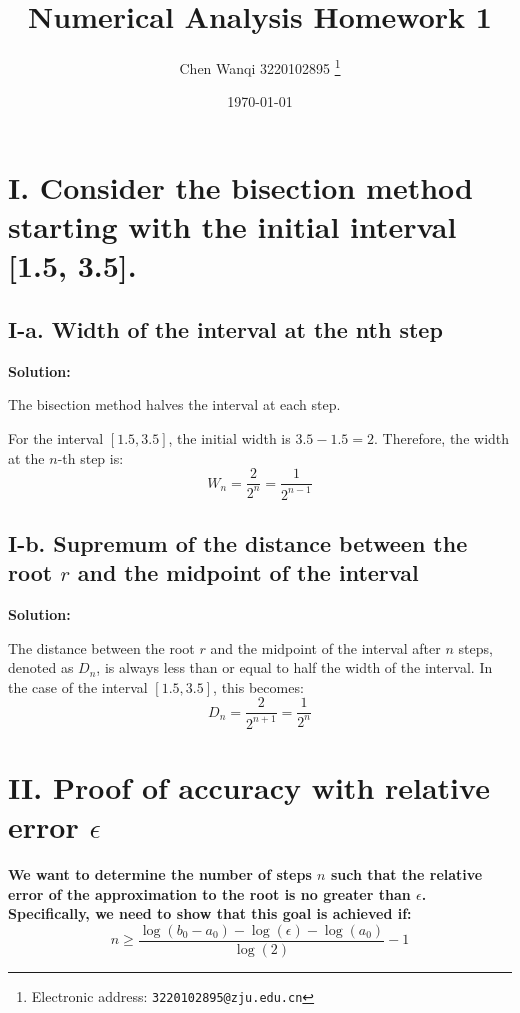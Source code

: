 \documentclass[a4paper]{article}
\begin{document}
\title{Numerical Analysis Homework  1}

\author{Chen Wanqi 3220102895
  \thanks{Electronic address: \texttt{3220102895@zju.edu.cn}}}


\date{\today}

\maketitle

\section*{I. Consider the bisection method starting with the initial interval [1.5, 3.5]. }
\subsection*{I-a. Width of the interval at the nth step}

\textbf{Solution:}

The bisection method halves the interval at each step.

For the interval $[1.5, 3.5]$, the initial width is $3.5 - 1.5 = 2$. Therefore, the width at the $n$-th step is: 
\[
W_n = \frac{2}{2^n} = \frac{1}{2^{n-1}}
\]

\subsection*{I-b. Supremum of the distance between the root $r$ and the midpoint of the interval}

\textbf{Solution:}

The distance between the root $r$ and the midpoint of the interval after $n$ steps, denoted as $D_n$, is always less than or equal to half the width of the interval. In the case of the interval $[1.5, 3.5]$, this becomes:
\[
D_n = \frac{2}{2^{n+1}} = \frac{1}{2^n}
\]

\section*{II. Proof of accuracy with relative error $\epsilon$}

\textbf{We want to determine the number of steps $n$ such that the relative error of the approximation to the root is no greater than $\epsilon$. Specifically, we need to show that this goal is achieved if:}
\[
n \geq \frac{\log(b_0 - a_0) - \log(\epsilon) - \log(a_0)}{\log(2)} - 1
\]
\end{document}
